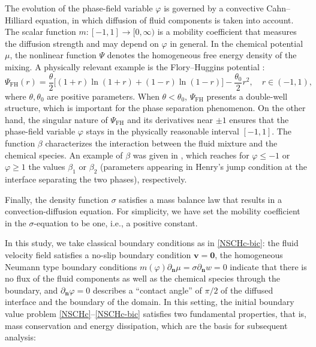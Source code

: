 \documentclass[11pt,reqno]{amsart}
\def\n{{\bm{n}}}
\def\vv{\bm{v}}
\begin{document}
The evolution of the phase-field variable $\varphi$ is governed by a convective Cahn--Hilliard equation, in which diffusion of fluid components is taken into account. The scalar function $m\colon [-1,1]\to [0,\infty)$ is a mobility coefficient that measures the diffusion strength and may depend on $\varphi$ in general. In the chemical potential $\mu$, the nonlinear function $\Psi$ denotes the homogeneous free energy density of the mixing. A physically relevant example is the Flory--Huggins potential \cite{CH}:
%
\begin{equation}
\label{Log}
\Psi_{\mathrm{FH}}(r)
=\frac{\theta}{2}\big[ (1+r)\ln(1+r)+(1-r)\ln(1-r)\big]-\frac{\theta_0}{2} r^2, \quad r \in (-1,1),
\end{equation}
%
where $\theta, \theta_0$ are positive parameters. When $\theta< \theta_0$, $\Psi_{\mathrm{FH}}$ presents a double-well structure, which is important for the phase separation phenomenon. On the other hand, the singular nature of $\Psi_{\mathrm{FH}}$ and its derivatives near $\pm 1$ ensures that the phase-field variable $\varphi$ stays in the physically reasonable interval $[-1,1]$. The function $\beta$ characterizes the interaction between the fluid mixture and the chemical species. An example of $\beta$ was given in \cite{AGG2012}, which reaches for $\varphi\leq -1$ or $\varphi\geq 1$ the values $\beta_1$ or $\beta_2$ (parameters appearing in Henry's jump condition at the interface separating the two phases), respectively.

Finally, the density function $\sigma$ satisfies a mass balance law that results in a convection-diffusion equation. For simplicity, we have set the mobility coefficient in the $\sigma$-equation to be one, i.e., a positive constant.

In this study, we take classical boundary conditions as in \eqref{NSCHc-bic}: the fluid velocity field satisfies a no-slip boundary condition $\vv=\mathbf{0}$, the homogeneous Neumann type boundary conditions $m(\varphi)\partial_\n \mu=\sigma \partial_\n w=0$ indicate that there is no flux of the fluid components as well as the chemical species through the boundary, and $\partial_\n \varphi=0$ describes a ``contact angle'' of $\pi/2$ of the diffused interface and the boundary of the domain. In this setting, the initial boundary value problem \eqref{NSCHc}--\eqref{NSCHc-bic} satisfies two fundamental properties, that is, mass conservation and energy dissipation, which are the basis for subsequent analysis:
\end{document}
